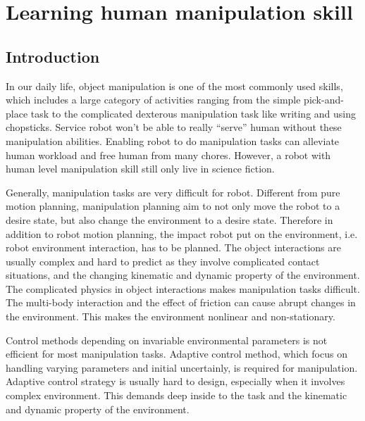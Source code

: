 \chapter{Learning human manipulation skill}
\label{cha4}

\section{Introduction}
\label{cha4:sec1}
In our daily life, object manipulation is one of the most commonly used skills, which includes a large category of activities ranging from the simple pick-and-place task to the complicated dexterous manipulation task like writing and using chopsticks. Service robot won't be able to really ``serve'' human without these manipulation abilities. Enabling robot to do manipulation tasks can alleviate human workload and free human from many chores. However, a robot with human level manipulation skill still only live in science fiction.

Generally, manipulation tasks are very difficult for robot. Different from pure motion planning, manipulation planning aim to not only move the robot to a desire state, but also change the environment to a desire state. Therefore in addition to robot motion planning, the impact robot put on the environment, i.e. robot environment interaction, has to be planned. The object interactions are usually complex and hard to predict as they involve complicated contact situations, and the changing kinematic and dynamic property of the environment. The complicated physics in object interactions makes manipulation tasks difficult. The multi-body interaction and the effect of friction can cause abrupt changes in the environment. This makes the environment nonlinear and non-stationary.

Control methods depending on invariable environmental parameters is not efficient for most manipulation tasks. Adaptive control method, which focus on handling varying parameters and initial uncertainly, is required for manipulation. Adaptive control strategy is usually hard to design, especially when it involves complex environment. This demands deep inside to the task and the kinematic and dynamic property of the environment.


